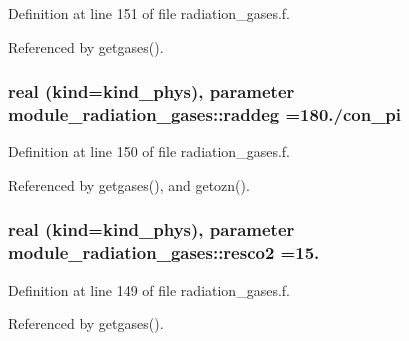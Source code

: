 Definition at line 151 of file radiation\+\_\+gases.\+f.



Referenced by getgases().

\subsubsection[{\texorpdfstring{raddeg}{raddeg}}]{\setlength{\rightskip}{0pt plus 5cm}real (kind=kind\+\_\+phys), parameter module\+\_\+radiation\+\_\+gases\+::raddeg =180./con\+\_\+pi\hspace{0.3cm}{\ttfamily [private]}}\hypertarget{group__module__radiation__gases_gaa5873ae54e950001ff873771378e7a1e}{}\label{group__module__radiation__gases_gaa5873ae54e950001ff873771378e7a1e}


Definition at line 150 of file radiation\+\_\+gases.\+f.



Referenced by getgases(), and getozn().

\subsubsection[{\texorpdfstring{resco2}{resco2}}]{\setlength{\rightskip}{0pt plus 5cm}real (kind=kind\+\_\+phys), parameter module\+\_\+radiation\+\_\+gases\+::resco2 =15.\hspace{0.3cm}{\ttfamily [private]}}\hypertarget{group__module__radiation__gases_gafda5c1d1129d865b9772e0f58dea7598}{}\label{group__module__radiation__gases_gafda5c1d1129d865b9772e0f58dea7598}


Definition at line 149 of file radiation\+\_\+gases.\+f.



Referenced by getgases().

